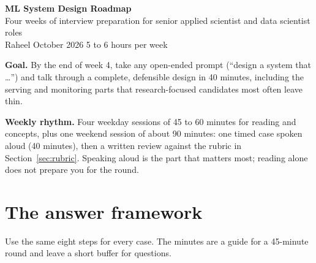 \documentclass[10pt,a4paper]{article}
\begin{document}
{\LARGE\bfseries\color{accent} ML System Design Roadmap}\\[3pt]
{\large Four weeks of interview preparation for senior applied scientist and
data scientist roles}\\[2pt]
{\color{muted}Raheel \textbullet{} October 2026 \textbullet{} 5 to 6 hours per week}

\vspace{6pt}

\textbf{Goal.} By the end of week 4, take any open-ended prompt (``design a
system that \ldots'') and talk through a complete, defensible design in 40
minutes, including the serving and monitoring parts that research-focused
candidates most often leave thin.

\textbf{Weekly rhythm.} Four weekday sessions of 45 to 60 minutes for reading
and concepts, plus one weekend session of about 90 minutes: one timed case
spoken aloud (40 minutes), then a written review against the rubric in
Section~\ref{sec:rubric}. Speaking aloud is the part that matters most; reading
alone does not prepare you for the round.

\section{The answer framework}

Use the same eight steps for every case. The minutes are a guide for a
45-minute round and leave a short buffer for questions.
\end{document}
